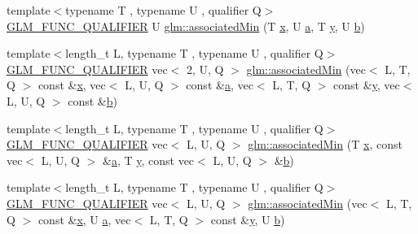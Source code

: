 \begin{DoxyCompactItemize}
\item 
{\footnotesize template$<$typename T , typename U , qualifier Q$>$ }\\\mbox{\hyperlink{setup_8hpp_a33fdea6f91c5f834105f7415e2a64407}{G\+L\+M\+\_\+\+F\+U\+N\+C\+\_\+\+Q\+U\+A\+L\+I\+F\+I\+ER}} U \mbox{\hyperlink{group__gtx__associated__min__max_gacc01bd272359572fc28437ae214a02df}{glm\+::associated\+Min}} (T \mbox{\hyperlink{_s_d_l__opengl_8h_ad0e63d0edcdbd3d79554076bf309fd47}{x}}, U \mbox{\hyperlink{_s_d_l__opengl__glext_8h_a3309789fc188587d666cda5ece79cf82}{a}}, T \mbox{\hyperlink{_s_d_l__opengl_8h_a1675d9d7bb68e1657ff028643b4037e3}{y}}, U \mbox{\hyperlink{_s_d_l__opengl__glext_8h_a0f71581a41fd2264c8944126dabbd010}{b}})
\item 
{\footnotesize template$<$length\+\_\+t L, typename T , typename U , qualifier Q$>$ }\\\mbox{\hyperlink{setup_8hpp_a33fdea6f91c5f834105f7415e2a64407}{G\+L\+M\+\_\+\+F\+U\+N\+C\+\_\+\+Q\+U\+A\+L\+I\+F\+I\+ER}} vec$<$ 2, U, Q $>$ \mbox{\hyperlink{group__gtx__associated__min__max_gac2f0dff90948f2e44386a5eafd941d1c}{glm\+::associated\+Min}} (vec$<$ L, T, Q $>$ const \&\mbox{\hyperlink{_s_d_l__opengl_8h_ad0e63d0edcdbd3d79554076bf309fd47}{x}}, vec$<$ L, U, Q $>$ const \&\mbox{\hyperlink{_s_d_l__opengl__glext_8h_a3309789fc188587d666cda5ece79cf82}{a}}, vec$<$ L, T, Q $>$ const \&\mbox{\hyperlink{_s_d_l__opengl_8h_a1675d9d7bb68e1657ff028643b4037e3}{y}}, vec$<$ L, U, Q $>$ const \&\mbox{\hyperlink{_s_d_l__opengl__glext_8h_a0f71581a41fd2264c8944126dabbd010}{b}})
\item 
{\footnotesize template$<$length\+\_\+t L, typename T , typename U , qualifier Q$>$ }\\\mbox{\hyperlink{setup_8hpp_a33fdea6f91c5f834105f7415e2a64407}{G\+L\+M\+\_\+\+F\+U\+N\+C\+\_\+\+Q\+U\+A\+L\+I\+F\+I\+ER}} vec$<$ L, U, Q $>$ \mbox{\hyperlink{group__gtx__associated__min__max_gacfec519c820331d023ef53a511749319}{glm\+::associated\+Min}} (T \mbox{\hyperlink{_s_d_l__opengl_8h_ad0e63d0edcdbd3d79554076bf309fd47}{x}}, const vec$<$ L, U, Q $>$ \&\mbox{\hyperlink{_s_d_l__opengl__glext_8h_a3309789fc188587d666cda5ece79cf82}{a}}, T \mbox{\hyperlink{_s_d_l__opengl_8h_a1675d9d7bb68e1657ff028643b4037e3}{y}}, const vec$<$ L, U, Q $>$ \&\mbox{\hyperlink{_s_d_l__opengl__glext_8h_a0f71581a41fd2264c8944126dabbd010}{b}})
\item 
{\footnotesize template$<$length\+\_\+t L, typename T , typename U , qualifier Q$>$ }\\\mbox{\hyperlink{setup_8hpp_a33fdea6f91c5f834105f7415e2a64407}{G\+L\+M\+\_\+\+F\+U\+N\+C\+\_\+\+Q\+U\+A\+L\+I\+F\+I\+ER}} vec$<$ L, U, Q $>$ \mbox{\hyperlink{group__gtx__associated__min__max_ga4757c7cab2d809124a8525d0a9deeb37}{glm\+::associated\+Min}} (vec$<$ L, T, Q $>$ const \&\mbox{\hyperlink{_s_d_l__opengl_8h_ad0e63d0edcdbd3d79554076bf309fd47}{x}}, U \mbox{\hyperlink{_s_d_l__opengl__glext_8h_a3309789fc188587d666cda5ece79cf82}{a}}, vec$<$ L, T, Q $>$ const \&\mbox{\hyperlink{_s_d_l__opengl_8h_a1675d9d7bb68e1657ff028643b4037e3}{y}}, U \mbox{\hyperlink{_s_d_l__opengl__glext_8h_a0f71581a41fd2264c8944126dabbd010}{b}})

\end{DoxyCompactItemize}
